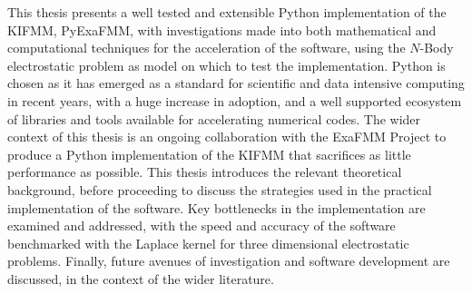 This thesis presents a well tested and extensible Python implementation of the KIFMM, \gls{PyExaFMM},
with investigations made into both mathematical and computational
techniques for the acceleration of the software, using the $N$-Body electrostatic
problem as model on which to test the implementation. Python is chosen as it has emerged as a standard
for scientific and data intensive computing in recent years, with a huge increase
in adoption, and a well supported ecosystem of libraries and tools available for
accelerating numerical codes. The wider context of this thesis
is an ongoing collaboration with the ExaFMM Project \cite{exafmm} to produce a Python
implementation of the KIFMM that sacrifices as little performance as possible.
This thesis introduces the relevant theoretical background, before
proceeding to discuss the strategies used in the practical implementation of the
software. Key bottlenecks in the implementation are examined and addressed, with the speed
and accuracy of the software benchmarked with the Laplace kernel for three dimensional
electrostatic problems. Finally, future avenues of investigation and software
development are discussed, in the context of the wider literature.
